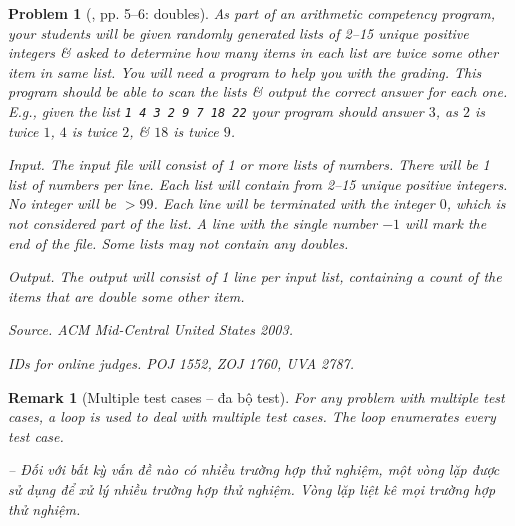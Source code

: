 \documentclass{article}
\newtheorem{problem}{Problem}
\newtheorem{remark}{Remark}
\begin{document}
\begin{problem}[\cite{Wu_Wang2016}, pp. 5--6: doubles]
	As part of an arithmetic competency program, your students will be given randomly generated lists of 2--15 unique positive integers \& asked to determine how many items in each list are twice some other item in same list. You will need a program to help you with the grading. This program should be able to scan the lists \& output the correct answer for each one. E.g., given the list {\tt1 4 3 2 9 7 18 22} your program should answer $3$, as $2$ is twice $1$, $4$ is twice $2$, \& $18$ is twice $9$.
	\item {\sf Input.} The input file will consist of 1 or more lists of numbers. There will be 1 list of numbers per line. Each list will contain from 2--15 unique positive integers. No integer will be $> 99$. Each line will be terminated with the integer $0$, which is not considered part of the list. A line with the single number $-1$ will mark the end of the file. Some lists may not contain any doubles.
	\item {\sf Output.} The output will consist of 1 line per input list, containing a count of the items that are double some other item.
	\item {\sf Source.} ACM Mid-Central United States 2003.
	\item {\sf IDs for online judges.} POJ 1552, ZOJ 1760, UVA 2787.
\end{problem}

\begin{remark}[Multiple test cases -- đa bộ test]
	For any problem with multiple test cases, a loop is used to deal with multiple test cases. The loop enumerates every test case.
	
	-- Đối với bất kỳ vấn đề nào có nhiều trường hợp thử nghiệm, một vòng lặp được sử dụng để xử lý nhiều trường hợp thử nghiệm. Vòng lặp liệt kê mọi trường hợp thử nghiệm.
\end{remark}
\end{document}
